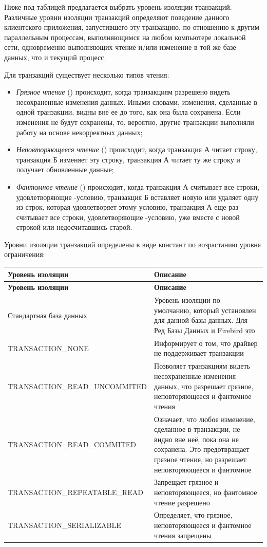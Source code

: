 Ниже под таблицей предлагается выбрать уровень изоляции транзакций. Различные уровни изоляции транзакций определяют поведение данного клиентского приложения, запустившего эту транзакцию, по отношению к другим параллельным процессам, выполняющимся на любом компьютере локальной сети, одновременно выполняющих чтение и/или изменение в той же базе данных, что и текущий процесс. 

Для транзакций существует несколько типов чтения:
\begin{itemize}
	\item \textit{Грязное чтение} () происходит, когда транзакциям разрешено видеть несохраненные изменения данных. Иными словами, изменения, сделанные в одной транзакции, видны вне ее до того, как она была сохранена. Если изменения не будут сохранены, то, вероятно, другие транзакции выполняли работу на основе некорректных данных;
	\item \textit{Неповторяющееся чтение} () происходит, когда транзакция А читает строку, транзакция Б изменяет эту строку, транзакция А читает ту же строку и получает обновленные данные;
	\item \textit{Фантомное чтение} () происходит, когда транзакция А считывает все строки, удовлетворяющие -условию, транзакция Б вставляет новую или удаляет одну из строк, которая удовлетворяет этому условию, транзакция А еще раз считывает все строки, удовлетворяющие -условию, уже вместе с новой строкой или недосчитавшись старой.
\end{itemize}

Уровни изоляции транзакций определены в виде констант по возрастанию уровня ограничения:\hypertarget{tab:isollevel}{}
\begin{longtable}[c]{|>{\ttfamily}m{5.2cm}|m{10.2cm}|}
	\hline
	\centering\normalfont\bfseries Уровень изоляции &
	\centering\arraybslash\bfseries Описание\\\hline
	\endfirsthead
	\hline
	\centering\normalfont\bfseries Уровень изоляции &
	\centering\arraybslash\bfseries Описание\\\hline
	\endhead
	Стандартная база данных & Уровень изоляции по умолчанию, который установлен для данной базы данных. Для Ред Базы Данных и Firebird это \ttt{READ\_COMMITED}\\\hline
	TRANSACTION\_NONE & Информирует о том, что драйвер не поддерживает транзакции\\\hline
	TRANSACTION\_READ\_UNCOMMITED & Позволяет транзакциям видеть несохраненные изменения данных, что разрешает грязное, неповторяющееся и фантомное чтения\\\hline
	TRANSACTION\_READ\_COMMITED & Означает, что любое изменение, сделанное в транзакции, не видно вне неё, пока она не сохранена. Это предотвращает грязное чтение, но разрешает неповторяющееся и фантомное\\\hline
	TRANSACTION\_REPEATABLE\_READ & Запрещает грязное и неповторяющееся, но фантомное чтение разрешено\\\hline
	TRANSACTION\_SERIALIZABLE & Определяет, что грязное, неповторяющееся и фантомное чтения запрещены\\\hline
\end{longtable} 	


